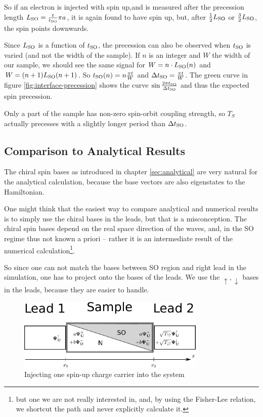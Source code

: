 So if an electron is injected with spin up,and is measured after the
precession length $L_{\textnormal{SO}} = \frac{t}{t_{\textnormal{SO}}}\pi a$, it is again found to have
spin up, but, after $\frac12 L_{\textnormal{SO}}$ or $\frac32 L_{\textnormal{SO}}$, the spin points
downwards. 

Since  $L_{\textnormal{SO}}$ is a function of $t_{\textnormal{SO}}$, the precession can also be
observed when $t_{\textnormal{SO}}$ is varied (and not the width of the sample).
If $n$ is an integer and $W$ the width of our sample, we should see the
same signal for $W = n \cdot L_{\textnormal{SO}}(n)$ and $W = (n+1) L_{\textnormal{SO}}(n+1)$. So
$t_{\textnormal{SO}}(n) = n\frac{\pi t}{W}$ and $\Delta t_{\textnormal{SO}} = \frac{\pi t}{W}$.  The green
curve in figure \ref{fig:interface-precession} shows the curve
$\sin{\frac{2 \pi \ensuremath{t_{\textnormal{SO}}}}{\Delta \ensuremath{t_{\textnormal{SO}}}}}$ and thus the expected spin precession.

Only a part of the sample has non-zero spin-orbit coupling strength, so $T_S$
actually precesses with a slightly longer period than $\Delta t_{\textnormal{SO}}$.

\subsection{Comparison to Analytical Results}

The chiral spin bases as introduced in chapter \ref{sec:analytical} are very
natural for the analytical calculation, because the
base vectors are also eigenstates to the Hamiltonian.

One might think that the easiest way to compare analytical and numerical
results is to simply use the chiral bases in the leads, but that is a
misconception. The chiral spin bases depend on the real space direction
of the waves, and, in the SO regime thus not known a priori --
rather it is an intermediate
result of the numerical calculation\footnote{but one we are not really
interested in, and, by using the Fisher-Lee relation, we shortcut the path and
never explicitly calculate it.}.

So since one can not match the bases between SO region and right lead in the
simulation, one has
to project onto the bases of the leads. We use the $\uparrow,\downarrow$ bases
in the leads, because they are easier to handle.

\begin{figure}
    \begin{center}
    \includegraphics[width=0.8\textwidth]{adapting-pic.pdf}
    \end{center}
    \caption{Injecting one spin-up charge carrier into the system}
\end{figure}

